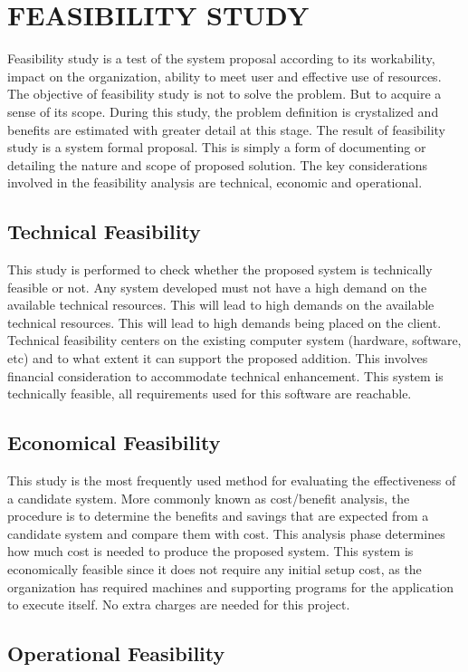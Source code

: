 \chapter{FEASIBILITY STUDY}

Feasibility study is a test of the system proposal according to its workability, impact on the organization, ability to meet user and effective use of resources. The objective of feasibility study is not to solve the problem. But to acquire a sense of its scope. During this study, the problem definition is crystalized and benefits are estimated with greater detail at this stage. The result of feasibility study is a system formal proposal. This is simply a form of documenting or detailing the nature and scope of proposed solution. The key considerations involved in the feasibility analysis are technical, economic and operational.
%
\section{Technical Feasibility}

This study is performed to check whether the proposed system is technically feasible or not. Any system developed must not have a high demand on the available technical resources. This will lead to high demands on the available technical resources. This will lead to high demands being placed on the client. Technical feasibility centers on the existing computer system (hardware, software, etc) and to what extent it can support the proposed addition. This involves financial consideration to accommodate technical enhancement. This system is technically feasible, all requirements used for this software are reachable. 
%
\section{Economical Feasibility}

This study is the most frequently used method for evaluating the effectiveness of a candidate system. More commonly known as cost/benefit analysis, the procedure is to determine the benefits and savings that are expected from a candidate system and compare them with cost. This analysis phase determines how much cost is needed to produce the proposed system. This system is economically feasible since it does not require any initial setup cost, as the organization has required machines and supporting programs for the application to execute itself. No extra charges are needed for this project.
%
\section{Operational Feasibility}

